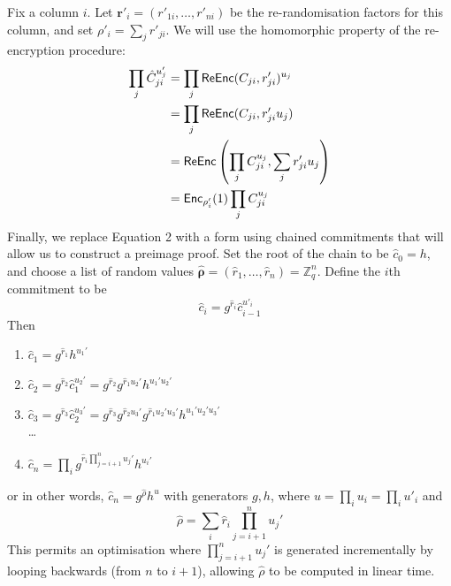 \documentclass[12pt,a4paper]{article}
\theoremstyle{definition}
\begin{document}
Fix a column $i$. Let $\mathbf{r}'_i=(r'_{1i},\ldots,r'_{ni})$ be the re-randomisation factors for this column, and set $\rho'_i=\sum_j r'_{ji}$. We will use the homomorphic property of the re-encryption procedure:
\begin{align}
    \prod_j \hat{C}_{ji}^{u_j'} &= \prod_j \mathsf{ReEnc}(C_{ji}, r'_{ji})^{u_j}\notag\\
        &= \prod_j \mathsf{ReEnc}(C_{ji}, r'_{ji}u_j)\notag\\
        &= \mathsf{ReEnc}\left(\prod_j C_{ji}^{u_j},\sum_j r'_{ji} u_j\right)\notag\\
        &= \mathsf{Enc}_{\rho'_i}(1)\prod_j C_{ji}^{u_j} \label{wikstrom-4}
\end{align}
Finally, we replace Equation 2 with a form using chained commitments that will allow us to construct a preimage proof. Set the root of the chain to be $\hat{c}_0 = h$, and choose a list of random values $\mathbf{\hat{\rho}}=(\hat{r}_1,\ldots,\hat{r}_n)=\mathbb{Z}_q^n$. Define the $i$th commitment to be
$$\hat{c}_i = g^{\hat{r}_i}\hat{c}_{i-1}^{u'_i}$$
Then
\begin{enumerate}
    \item $\hat{c}_1 = g^{\hat{r}_1}h^{u_1'}$
    \item $\hat{c}_2 = g^{\hat{r}_2}\hat{c}_1^{u_2'} = g^{\hat{r}_2}g^{\hat{r}_1 u_2'}h^{u_1' u_2'}$
    \item $\hat{c}_3 = g^{\hat{r}_3}\hat{c}_2^{u_3'} = g^{\hat{r}_3}g^{\hat{r}_2 u_3'}g^{\hat{r}_1 u_2' u_3'}h^{u_1' u_2' u_3'}$\\
    \ldots
    \item $\hat{c}_n = \prod_i g^{\hat{r}_i \prod_{j=i + 1}^n u_j'}h^{u_i'}$
\end{enumerate}
or in other words, $\hat{c}_n = g^{\hat{\rho}} h^{u}$ with generators $g, h$, where $u=\prod_i u_i=\prod_i u'_i$ and
$$\hat{\rho}=\sum_i \hat{r}_i \prod_{j=i+1}^n u_j'$$
This permits an optimisation where $\prod_{j=i+1}^n u_j'$ is generated incrementally by looping backwards (from $n$ to $i + 1$), allowing $\hat{\rho}$ to be computed in linear time.
\end{document}
